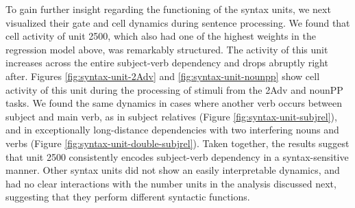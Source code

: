 To gain further insight regarding the functioning of the syntax units,
we next visualized their gate and cell dynamics during sentence
processing. We found that cell activity of unit
\unit{2}{500}, which also had one of the highest weights in the
regression model above, was remarkably structured. The activity of
this unit increases across the entire subject-verb
dependency and drops abruptly right after. Figures
\ref{fig:syntax-unit-2Adv} and \ref{fig:syntax-unit-nounpp} show cell
activity of this unit during the processing of stimuli from the 2Adv
and nounPP tasks. We found the same dynamics in cases where another
verb occurs between subject and main verb, as in subject relatives
(Figure \ref{fig:syntax-unit-subjrel}), and in exceptionally
long-distance dependencies with two interfering nouns and verbs
(Figure \ref{fig:syntax-unit-double-subjrel}). Taken together, the
results suggest that unit \unit{2}{500} consistently encodes
subject-verb dependency in a syntax-sensitive manner.  Other syntax
units did not show an easily interpretable dynamics, and had no clear
interactions with the number units in the analysis discussed next,
suggesting that they perform different syntactic functions.


